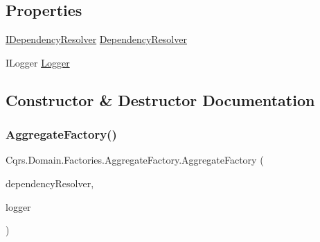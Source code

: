 \subsection*{Properties}
\begin{DoxyCompactItemize}
\item 
\hyperlink{interfaceCqrs_1_1Configuration_1_1IDependencyResolver}{I\+Dependency\+Resolver} \hyperlink{classCqrs_1_1Domain_1_1Factories_1_1AggregateFactory_acae0733e4069776322e0c4cb5d335c09_acae0733e4069776322e0c4cb5d335c09}{Dependency\+Resolver}
\item 
I\+Logger \hyperlink{classCqrs_1_1Domain_1_1Factories_1_1AggregateFactory_a78a24b5139cda7a07f938169a406f66e_a78a24b5139cda7a07f938169a406f66e}{Logger}
\end{DoxyCompactItemize}


\subsection{Constructor \& Destructor Documentation}
\mbox{\label{classCqrs_1_1Domain_1_1Factories_1_1AggregateFactory_a8731bed6c8a8594c17bf0d32ff83939a_a8731bed6c8a8594c17bf0d32ff83939a}} 
\subsubsection{\texorpdfstring{Aggregate\+Factory()}{AggregateFactory()}}
{\footnotesize\ttfamily Cqrs.\+Domain.\+Factories.\+Aggregate\+Factory.\+Aggregate\+Factory (\begin{DoxyParamCaption}\item[{\hyperlink{interfaceCqrs_1_1Configuration_1_1IDependencyResolver}{I\+Dependency\+Resolver}}]{dependency\+Resolver,  }\item[{I\+Logger}]{logger }\end{DoxyParamCaption})}



